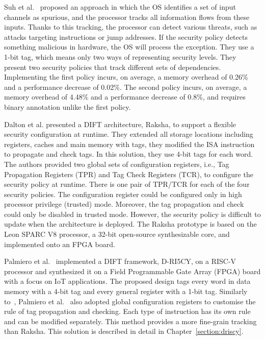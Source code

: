 Suh et al.~\cite{SLD-04-sigplan} proposed an approach in which the OS identifies a set of input channels as spurious, and the processor tracks all information flows from these inputs. Thanks to this tracking, the processor can detect various threats, such as attacks targeting instructions or jump addresses. If the security policy detects something malicious in hardware, the OS will process the exception. They use a 1-bit tag, which means only two ways of representing security levels. They present two security policies that track different sets of dependencies. Implementing the first policy incurs, on average, a memory overhead of 0.26\% and a performance decrease of 0.02\%. The second policy incurs, on average, a memory overhead of 4.48\% and a performance decrease of 0.8\%, and requires binary annotation unlike the first policy.

Dalton et al.\cite{DKK-07-sigarch} presented a DIFT architecture, Raksha, to support a flexible security configuration at runtime. They extended all storage locations including registers, caches and main memory with tags, they modified the ISA instruction to propagate and check tags. In this solution, they use 4-bit tags for each word.
The authors provided two global sets of configuration registers, i.e., Tag Propagation Registers (TPR) and Tag Check Registers (TCR), to configure the security policy at runtime. There is one pair of TPR/TCR for each of the four security policies. The configuration register could be configured only in high processor privilege (trusted) mode. Moreover, the tag propagation and check could only be disabled in trusted mode. However, the security policy is difficult to update when the architecture is deployed.
The Raksha prototype is based on the Leon SPARC V8 processor, a 32-bit open-source synthesizable core, and implemented onto an FPGA board.

Palmiero et al.~\cite{PDGLC-18-hpec} implemented a DIFT framework, D-RI5CY, on a RISC-V processor and synthesized it on a Field Programmable Gate Array (FPGA) board with a focus on IoT applications. The proposed design tags every word in data memory with a 4-bit tag and every general register with a 1-bit tag. Similarly to~\cite{DKK-07-sigarch}, Palmiero et al.~\cite{PDGLC-18-hpec} also adopted global configuration registers to customise the rule of tag propagation and checking. Each type of instruction has its own rule and can be modified separately. This method provides a more fine-grain tracking than Raksha. This solution is described in detail in Chapter~\ref{section:driscy}.

